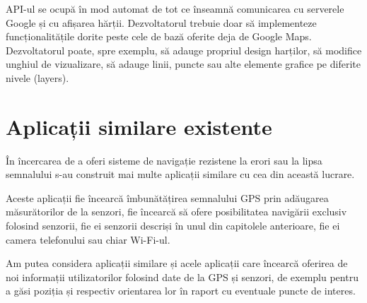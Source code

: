 \documentclass[12pt,a4paper]{article}
\begin{document}
API-ul se ocupă în mod automat de tot ce înseamnă comunicarea cu serverele Google și cu afișarea hărții. Dezvoltatorul trebuie doar să implementeze funcționalitățile dorite peste cele de bază oferite deja de Google Maps. Dezvoltatorul poate, spre exemplu, să adauge propriul design harților, să modifice unghiul de vizualizare, să adauge linii, puncte sau alte elemente grafice pe diferite nivele (layers).



\section{Aplicații similare existente}
În încercarea de a oferi sisteme de navigație rezistene la erori sau la lipsa semnalului s-au construit mai multe aplicații similare cu cea din această lucrare.

Aceste aplicații fie încearcă îmbunătățirea semnalului GPS prin adăugarea măsurătorilor de la senzori, fie încearcă să ofere posibilitatea navigării exclusiv folosind senzorii, fie ei senzorii descriși în unul din capitolele anterioare, fie ei camera telefonului sau chiar Wi-Fi-ul.

Am putea considera aplicații similare și acele aplicații care încearcă oferirea de noi informații utilizatorilor folosind date de la GPS și senzori, de exemplu pentru a găsi poziția și respectiv orientarea lor în raport cu eventuale puncte de interes. %
\end{document}
